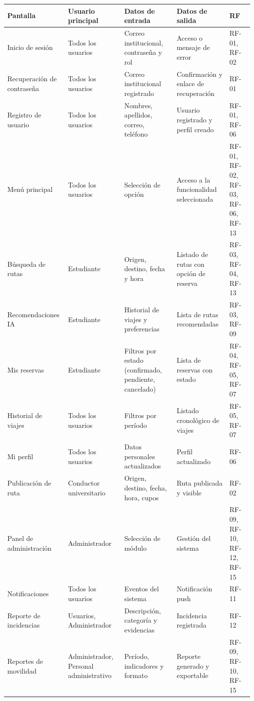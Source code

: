 \documentclass[11pt,a4paper]{article}
\begin{document}
\vspace{6pt}
\noindent
\begin{tabular}{|>{\raggedright\arraybackslash}p{2.5cm}|>{\raggedright\arraybackslash}p{2.2cm}|>{\raggedright\arraybackslash}p{3.2cm}|>{\raggedright\arraybackslash}p{3cm}|>{\raggedright\arraybackslash}p{1.8cm}|}
\hline
\rowcolor{uteqgreen!40} \textbf{Pantalla} & \textbf{Usuario principal} & \textbf{Datos de entrada} & \textbf{Datos de salida} & \textbf{RF} \\
\hline
Inicio de sesión & Todos los usuarios & Correo institucional, contraseña y rol & Acceso o mensaje de error & RF-01, RF-02 \\
\hline
Recuperación de contraseña & Todos los usuarios & Correo institucional registrado & Confirmación y enlace de recuperación & RF-01 \\
\hline
Registro de usuario & Todos los usuarios & Nombres, apellidos, correo, teléfono & Usuario registrado y perfil creado & RF-01, RF-06 \\
\hline
Menú principal & Todos los usuarios & Selección de opción & Acceso a la funcionalidad seleccionada & RF-01, RF-02, RF-03, RF-06, RF-13 \\
\hline
Búsqueda de rutas & Estudiante & Origen, destino, fecha y hora & Listado de rutas con opción de reserva & RF-03, RF-04, RF-13 \\
\hline
Recomendaciones IA & Estudiante & Historial de viajes y preferencias & Lista de rutas recomendadas & RF-03, RF-09 \\
\hline
Mis reservas & Estudiante & Filtros por estado (confirmado, pendiente, cancelado) & Lista de reservas con estado & RF-04, RF-05, RF-07 \\
\hline
Historial de viajes & Todos los usuarios & Filtros por período & Listado cronológico de viajes & RF-05, RF-07 \\
\hline
Mi perfil & Todos los usuarios & Datos personales actualizados & Perfil actualizado & RF-06 \\
\hline
Publicación de ruta & Conductor universitario & Origen, destino, fecha, hora, cupos & Ruta publicada y visible & RF-02 \\
\hline
Panel de administración & Administrador & Selección de módulo & Gestión del sistema & RF-09, RF-10, RF-12, RF-15 \\
\hline
Notificaciones & Todos los usuarios & Eventos del sistema & Notificación push & RF-11 \\
\hline
Reporte de incidencias & Usuarios, Administrador & Descripción, categoría y evidencias & Incidencia registrada & RF-12 \\
\hline
Reportes de movilidad & Administrador, Personal administrativo & Período, indicadores y formato & Reporte generado y exportable & RF-09, RF-10, RF-15 \\
\hline
\end{tabular}
\end{document}
